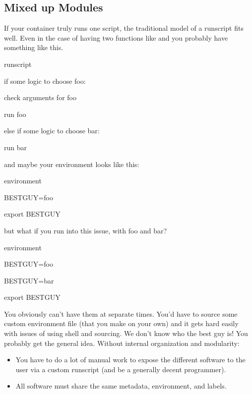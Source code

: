 \documentclass[letterpaper,10pt,english]{sphinxmanual}
\begin{document}
\subsection{Mixed up Modules}
\label{\detokenize{reproducible_scif_apps:mixed-up-modules}}
\begin{DUlineblock}{0em}
\item[] If your container truly runs one script, the traditional model of a
runscript fits well. Even in the case of having two functions like  and 
you probably have something like this.
\end{DUlineblock}

%
\begin{sphinxVerbatim}[commandchars=\\\{\}]
\PYGZpc{}runscript

if some logic to choose foo:

   check arguments for foo

   run foo

else if some logic to choose bar:

   run bar
\end{sphinxVerbatim}

and maybe your environment looks like this:

%
\begin{sphinxVerbatim}[commandchars=\\\{\}]
\PYGZpc{}environment

    BEST\PYGZus{}GUY=foo

    export BEST\PYGZus{}GUY
\end{sphinxVerbatim}

\begin{DUlineblock}{0em}
\item[] but what if you run into this issue, with foo and bar?
\end{DUlineblock}

%
\begin{sphinxVerbatim}[commandchars=\\\{\}]
\PYGZpc{}environment

    BEST\PYGZus{}GUY=foo

    BEST\PYGZus{}GUY=bar

    export BEST\PYGZus{}GUY
\end{sphinxVerbatim}

You obviously can’t have them at separate times. You’d have to source
some custom environment file (that you make on your own) and it gets
hard easily with issues of using shell and sourcing. We don’t know who
the best guy is! You probably get the general idea. Without internal
organization and modularity:
\begin{itemize}
\item {} 
You have to do a lot of manual work to expose the different software
to the user via a custom runscript (and be a generally decent
programmer).

\item {} 
All software must share the same metadata, environment, and labels.

\end{itemize}
\end{document}
